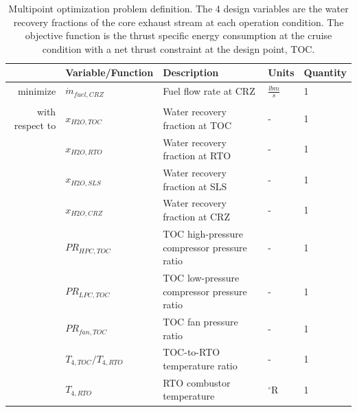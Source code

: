 \documentclass[conf]{new-aiaa}
\begin{document}
\begin{table}[h]
    \centering
    \caption{
        Multipoint optimization problem definition.
        The 4 design variables are the water recovery fractions of the core exhaust stream at each operation condition.
        The objective function is the thrust specific energy consumption at the cruise condition with a net thrust constraint at the design point, TOC.
    }
    \small
    \renewcommand{\arraystretch}{1.2}
    \begin{tabular}{r l l l l}
        \toprule
                        & Variable/Function           & Description                                 & Units           & Quantity \\
        \hline
        minimize        & $ \dot{m}_{fuel,CRZ} $      & Fuel flow rate at CRZ                       & $\frac{lbm}{s}$ & 1        \\
                        &                             &                                             &                 &          \\
        with respect to & $x_{H2O,TOC}$               & Water recovery fraction at TOC              & -               & 1        \\
                        & $x_{H2O,RTO}$               & Water recovery fraction at RTO              & -               & 1        \\
                        & $x_{H2O,SLS}$               & Water recovery fraction at SLS              & -               & 1        \\
                        & $x_{H2O,CRZ}$               & Water recovery fraction at CRZ              & -               & 1        \\
                        & $PR_{HPC,TOC}$              & TOC high-pressure compressor pressure ratio & -               & 1        \\
                        & $PR_{LPC,TOC}$              & TOC low-pressure compressor pressure ratio  & -               & 1        \\
                        & $PR_{fan,TOC}$              & TOC fan pressure ratio                      & -               & 1        \\
                        & $T_{4,TOC}/T_{4,RTO}$       & TOC-to-RTO temperature ratio                & -               & 1        \\
                        & $T_{4,RTO}$                 & RTO combustor temperature                   & $^\circ$R       & 1        \\

\end{tabular}
\end{table}
\end{document}

